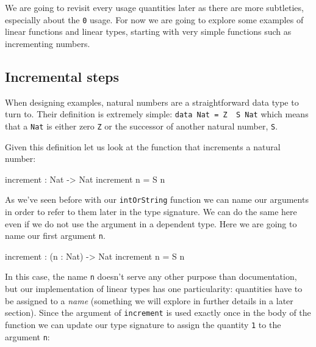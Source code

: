 \documentclass[
]{article}
\newenvironment{Shaded}{}{}
\newcommand{\DataTypeTok}[1]{\textcolor[rgb]{0.56,0.13,0.00}{#1}}
\newcommand{\NormalTok}[1]{#1}
\newcommand{\OperatorTok}[1]{\textcolor[rgb]{0.40,0.40,0.40}{#1}}
\newcommand{\OtherTok}[1]{\textcolor[rgb]{0.00,0.44,0.13}{#1}}
\begin{document}
We are going to revisit every usage quantities later as there are more
subtleties, especially about the \texttt{0} usage. For now we are going
to explore some examples of linear functions and linear types, starting
with very simple functions such as incrementing numbers.

\hypertarget{incremental-steps}{%
\subsection{Incremental steps}\label{incremental-steps}}

When designing examples, natural numbers are a straightforward data type
to turn to. Their definition is extremely simple:
\texttt{data\ Nat\ =\ Z\ \textbar{}\ S\ Nat} which means that a
\texttt{Nat} is either zero \texttt{Z} or the successor of another
natural number, \texttt{S}.

Given this definition let us look at the function that increments a
natural number:

\begin{Shaded}
\begin{Highlighting}[]
\NormalTok{increment }\OperatorTok{:} \DataTypeTok{Nat} \OtherTok{{-}\textgreater{}} \DataTypeTok{Nat}
\NormalTok{increment n }\OtherTok{=} \DataTypeTok{S}\NormalTok{ n}
\end{Highlighting}
\end{Shaded}

As we've seen before with our \texttt{intOrString} function we can name
our arguments in order to refer to them later in the type signature. We
can do the same here even if we do not use the argument in a dependent
type. Here we are going to name our first argument \texttt{n}.

\begin{Shaded}
\begin{Highlighting}[]
\NormalTok{increment }\OperatorTok{:}\NormalTok{ (n }\OperatorTok{:} \DataTypeTok{Nat}\NormalTok{) }\OtherTok{{-}\textgreater{}} \DataTypeTok{Nat}
\NormalTok{increment n }\OtherTok{=} \DataTypeTok{S}\NormalTok{ n}
\end{Highlighting}
\end{Shaded}

In this case, the name \texttt{n} doesn't serve any other purpose than
documentation, but our implementation of linear types has one
particularity: quantities have to be assigned to a \emph{name}
(something we will explore in further details in a later section). Since
the argument of \texttt{increment} is used exactly once in the body of
the function we can update our type signature to assign the quantity
\texttt{1} to the argument \texttt{n}:
\end{document}
